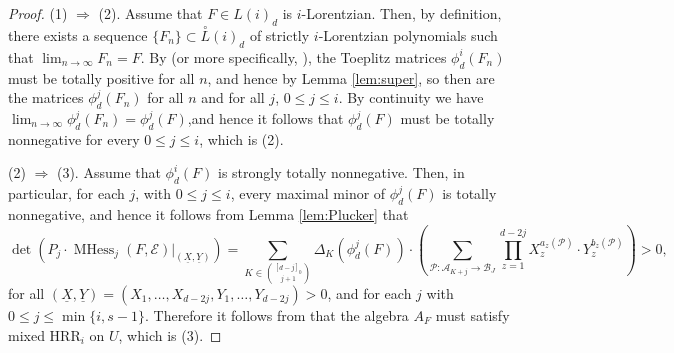 \documentclass[unnumsec,webpdf,modern,medium]{oup-authoring-template}
\newcommand{\Lor}{\overset{\circ}{L}}
\theoremstyle{theorem}
\theoremstyle{definition}
\begin{document}
\begin{proof}	
	(1) $\Rightarrow$ (2).  Assume that $F\in L(i)_d$ is $i$-Lorentzian.  Then, by definition, there exists a sequence $\{F_n\}\subset \Lor(i)_d$ of strictly $i$-Lorentzian polynomials such that $\lim_{n\to\infty}F_n=F$.  By \cite[Theorem 1]{MMS} (or more specifically, \cite[Proposition 4.8]{MMS}), the Toeplitz matrices $\phi^i_d(F_n)$ must be totally positive for all $n$, and hence by Lemma \ref{lem:super}, so then are the matrices $\phi^j_d(F_n)$ for all $n$ and for all $j$, $0\leq j\leq i$.  By continuity we have $\lim_{n\to\infty}\phi^j_d(F_n)=\phi^j_d(F)$,and hence it follows that $\phi^j_d(F)$ must be totally nonnegative for every $0\leq j\leq i$, which is (2).
	
	(2) $\Rightarrow$ (3).  Assume that $\phi^i_d(F)$ is strongly totally nonnegative.  Then, in particular, for each $j$, with $0\leq j\leq i$, every maximal minor of $\phi^j_d(F)$ is totally nonnegative, and hence it follows from Lemma \ref{lem:Plucker} that  
	$$\det\left(P_j\cdot\operatorname{MHess}_j(F,\mathcal{E})|_{(\underline{X},\underline{Y})}\right)=\sum_{K\in\binom{[d-j]_0}{j+1}}\Delta_K(\phi^j_d(F))\cdot\left(\sum_{\mathcal{P}\colon \mathcal{A}_{K+j}\rightarrow\mathcal{B}_J}\prod_{z=1}^{d-2j}X_z^{a_z(\mathcal{P})}\cdot Y_z^{b_z(\mathcal{P})}\right)>0,$$
	for all $(\underline{X},\underline{Y})=(X_1,\ldots,X_{d-2j},Y_1,\ldots,Y_{d-2j})>0$, and for each $j$ with $0\leq j\leq \min\{i,s-1\}$.
	Therefore it follows from \cite[Lemma 3.13]{MMS} that the algebra $A_F$ must satisfy mixed HRR$_i$ on $U$, which is (3).   
	
	
	
	
	

\end{proof}
\end{document}
